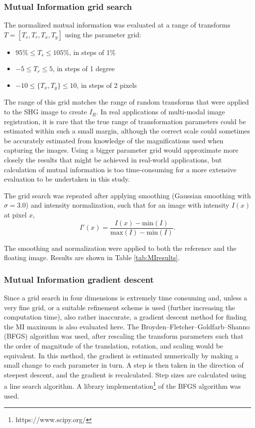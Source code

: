 \documentclass{report}
\begin{document}
\subsubsection{Mutual Information grid search}
The normalized mutual information was evaluated at a range of transforms $T = [T_s, T_r, T_x, T_y]$ using the parameter grid:
\begin{itemize}
    \item $95\% \leq T_s \leq 105\%$, in steps of 1\%
    \item $-5 \leq T_r \leq 5$, in steps of 1 degree
    \item $-10 \leq \{T_x, T_y\} \leq 10$, in steps of 2 pixels
\end{itemize}
The range of this grid matches the range of random transforms that were applied to the SHG image to create $I_R$. In real applications of multi-modal image registration, it is rare that the true range of transformation parameters could be estimated within such a small margin, although the correct scale could sometimes be accurately estimated from knowledge of the magnifications used when capturing the images. Using a bigger parameter grid would approximate more closely the results that might be achieved in real-world applications, but calculation of mutual information is too  time-consuming for a more extensive evaluation to be undertaken in this study.


The grid search was repeated after applying smoothing (Gaussian smoothing with $\sigma = 3.0$) and intensity normalization, such that for an image with intensity $I(x)$ at pixel $x$, 
\[
I'(x) = \frac{I(x)-\text{min}(I)}{\text{max}(I)-\text{min}(I)}.
\]

The smoothing and normalization were applied to both the reference and the floating image. Results are shown in Table \ref{tab:MIresults}.

\subsubsection{Mutual Information gradient descent}
Since a grid search in four dimensions is extremely time consuming and, unless a very fine grid, or a suitable refinement scheme is used (further increasing the computation time), also rather inaccurate, a gradient descent method for finding the MI maximum is also evaluated here. The Broyden–Fletcher–Goldfarb–Shanno (BFGS) algorithm was used, after rescaling the transform parameters such that the order of magnitude of the translation, rotation, and scaling would be equivalent. In this method, the gradient is estimated numerically by making a small change to each parameter in turn. A step is then taken in the direction of steepest descent, and the gradient is recalculated. Step sizes are calculated using a line search algorithm. A library implementation\footnote{https://www.scipy.org/} of the BFGS algorithm was used.
\end{document}
